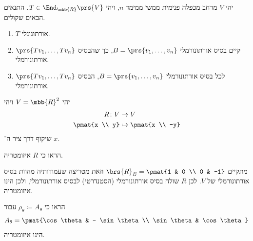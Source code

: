 \documentclass[a4paper,10pt,twoside,openany]{book}
\begin{document}
\begin{proposition}
יהי
$V$
מרחב מכפלה פנימית ממשי ממימד
$n$,
ויהי
$T \in \End_{\mbb{R}}\prs{V}$.
התנאים הבאים שקולים.

\begin{enumerate}
    \item $T$ אורתוגונלי.

    \item קיים בסיס אורתונורמלי
    $B = \prs{v_1, \ldots, v_n}$,
    כך שהבסיס
    $\prs{T v_1, \ldots, Tv_n}$
    אורתונורמלי.
    
    \item לכל בסיס אורתונורמלי
    $B = \prs{v_1, \ldots, v_n}$,
    הבסיס
    $\prs{T v_1, \ldots, Tv_n}$
    אורתונורמלי.
\end{enumerate}
\end{proposition}

\begin{exercisechap}
יהי
$V = \mbb{R}^2$
ויהי
\begin{align*}
    R \colon V &\to V \\
    \pmat{x \\ y} &\mapsto \pmat{x \\ -y}
\end{align*}
שיקוף דרך ציר ה־%
$x$.

הראו כי
$R$
איזומטריה.
\end{exercisechap}

\begin{solution}
מתקיים
$\brs{R}_E = \pmat{1 & 0 \\ 0 & -1}$
וזאת מטריצה שעמודותיה מהוות בסיס אורתונורמלי של
$V$.
לכן
$R$
שולח בסיס אורתונורמלי (הסטנדרטי) לבסיס אורתונורמלי, ולכן הינו איזומטריה.
\end{solution}

\begin{exercisechap}
הראו כי
$\rho_\theta \coloneqq A_\theta$
עבור
\[A_\theta = \pmat{\cos \theta & - \sin \theta \\ \sin \theta & \cos\theta}\]
הינו איזומטריה.
\end{exercisechap}
\end{document}
